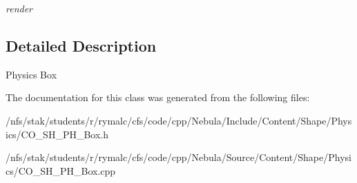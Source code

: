 \begin{DoxyCompactItemize}
\begin{DoxyCompactList}\small\item\em render \item\end{DoxyCompactList}\end{DoxyCompactItemize}


\subsection{Detailed Description}
Physics Box 

The documentation for this class was generated from the following files:\begin{DoxyCompactItemize}
\item 
/nfs/stak/students/r/rymalc/cfs/code/cpp/Nebula/Include/Content/Shape/Physics/CO\_\-SH\_\-PH\_\-Box.h\item 
/nfs/stak/students/r/rymalc/cfs/code/cpp/Nebula/Source/Content/Shape/Physics/CO\_\-SH\_\-PH\_\-Box.cpp\end{DoxyCompactItemize}
